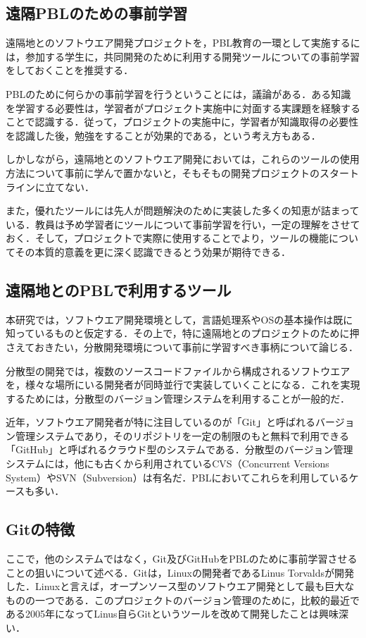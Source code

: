 \documentclass[a4j, 12Q, twocolumn, twoside]{jsarticle}
\begin{document}
\subsection{遠隔PBLのための事前学習}
遠隔地とのソフトウエア開発プロジェクトを，PBL教育の一環として実施するには，参加する学生に，共同開発のために利用する開発ツールについての事前学習をしておくことを推奨する．

PBLのために何らかの事前学習を行うということには，議論がある．ある知識を学習する必要性は，学習者がプロジェクト実施中に対面する実課題を経験することで認識する．従って，プロジェクトの実施中に，学習者が知識取得の必要性を認識した後，勉強をすることが効果的である，という考え方もある．

しかしながら，遠隔地とのソフトウエア開発においては，これらのツールの使用方法について事前に学んで置かないと，そもそもの開発プロジェクトのスタートラインに立てない．

また，優れたツールには先人が問題解決のために実装した多くの知恵が詰まっている．教員は予め学習者にツールについて事前学習を行い，一定の理解をさせておく．そして，プロジェクトで実際に使用することでより，ツールの機能についてその本質的意義を更に深く認識できるとう効果が期待できる．

\subsection{遠隔地とのPBLで利用するツール}
本研究では，ソフトウエア開発環境として，言語処理系やOSの基本操作は既に知っているものと仮定する．その上で，特に遠隔地とのプロジェクトのために押さえておきたい，分散開発環境について事前に学習すべき事柄について論じる．

分散型の開発では，複数のソースコードファイルから構成されるソフトウエアを，様々な場所にいる開発者が同時並行で実装していくことになる．これを実現するためには，分散型のバージョン管理システムを利用することが一般的だ．

近年，ソフトウエア開発者が特に注目しているのが「Git」と呼ばれるバージョン管理システムであり，そのリポジトリを一定の制限のもと無料で利用できる「GitHub」と呼ばれるクラウド型のシステムである．分散型のバージョン管理システムには，他にも古くから利用されているCVS（Concurrent Versions System）やSVN（Subversion）は有名だ．PBLにおいてこれらを利用しているケースも多い．

\subsection{Gitの特徴}
ここで，他のシステムではなく，Git及びGitHubをPBLのために事前学習させることの狙いについて述べる．Gitは，Linuxの開発者であるLinus Torvaldsが開発した．Linuxと言えば，オープンソース型のソフトウエア開発として最も巨大なものの一つである．このプロジェクトのバージョン管理のために，比較的最近である2005年になってLinus自らGitというツールを改めて開発したことは興味深い．
\end{document}
